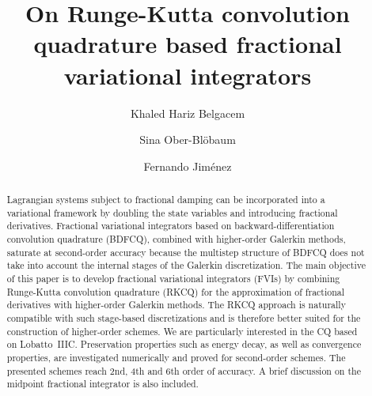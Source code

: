 \documentclass[a4paper,10pt,reqno]{amsart}
\theoremstyle{definition}
\begin{document}
\title{On Runge-Kutta convolution quadrature based fractional variational integrators}

\begin{abstract}
Lagrangian systems subject to fractional damping can be incorporated into a 
  variational framework by doubling the state 
  variables and introducing fractional derivatives. 
Fractional variational integrators based on backward-differentiation convolution quadrature (BDFCQ),
  combined with higher-order Galerkin methods, saturate at second-order accuracy because the multistep structure of BDFCQ does not take into account the internal stages of the Galerkin discretization. The main objective of this paper is to develop fractional variational integrators (FVIs) by combining Runge-Kutta convolution quadrature (RKCQ) for the approximation of fractional derivatives with higher-order Galerkin methods. The RKCQ approach is naturally compatible with such stage-based discretizations and is therefore better suited for the
  construction of higher-order schemes.  We are particularly interested in the CQ based on Lobatto~IIIC. Preservation properties such as energy decay, as well as convergence properties, are investigated numerically and proved for
  second-order schemes. The presented schemes reach 2nd, 4th and 6th order of
  accuracy. A brief discussion on the midpoint fractional integrator is also
  included.
\end{abstract}



\author{Khaled Hariz Belgacem}
\address{Department of Mathematics, University of Paderborn, Warburger Straße 100, 33098 Paderborn, Germany}

\author{Sina Ober-Bl\"obaum}
\address{Department of Mathematics, University of Paderborn, Warburger Straße 100, 33098 Paderborn, Germany}

\author{Fernando Jim\'enez}
\address{Departamento de Matemática Aplicada I, ETSII, Universidad Nacional de Educación a Distancia (UNED)
c. Juan del Rosal 12, 28040, Madrid, Spain.}

\maketitle
\end{document}
